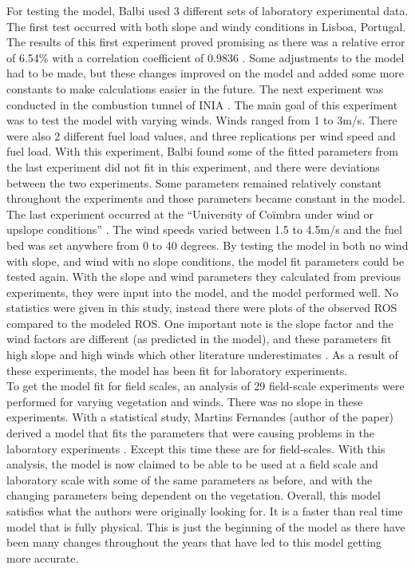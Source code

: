 \documentclass{article}
\begin{document}
\indent For testing the model, Balbi used 3 different sets of laboratory experimental data. The first test occurred with both slope and windy conditions in Lisboa, Portugal. The results of this first experiment proved promising as there was a relative error of 6.54\% with a correlation coefficient of 0.9836 \cite{Balbi2007}. Some adjustments to the model had to be made, but these changes improved on the model and added some more constants to make calculations easier in the future. The next experiment was conducted in the combustion tunnel of INIA \cite{Balbi2007}. The main goal of this experiment was to test the model with varying winds. Winds ranged from 1 to 3m/s. There were also 2 different fuel load values, and three replications per wind speed and fuel load. With this experiment, Balbi found some of the fitted parameters from the last experiment did not fit in this experiment, and there were deviations between the two experiments. Some parameters remained relatively constant throughout the experiments and those parameters became constant in the model. The last experiment occurred at the “University of Coïmbra under wind or upslope conditions” \cite{Balbi2007}. The wind speeds varied between 1.5 to 4.5m/s and the fuel bed was set anywhere from 0 to 40 degrees. By testing the model in both no wind with slope, and wind with no slope conditions, the model fit parameters could be tested again. With the slope and wind parameters they calculated from previous experiments, they were input into the model, and the model performed well. No statistics were given in this study, instead there were plots of the observed ROS compared to the modeled ROS. One important note is the slope factor and the wind factors are different (as predicted in the model), and these parameters fit high slope and high winds which other literature underestimates \cite{Balbi2007}. As a result of these experiments, the model has been fit for laboratory experiments. \\
\indent To get the model fit for field scales, an analysis of 29 field-scale experiments were performed for varying vegetation and winds. There was no slope in these experiments. With a statistical study, Martins Fernandes (author of the paper) derived a model that fits the parameters that were causing problems in the laboratory experiments \cite{Balbi2007}. Except this time these are for field-scales. With this analysis, the model is now claimed to be able to be used at a field scale and laboratory scale with some of the same parameters as before, and with the changing parameters being dependent on the vegetation. Overall, this model satisfies what the authors were originally looking for. It is a faster than real time model that is fully physical. This is just the beginning of the model as there have been many changes throughout the years that have led to this model getting more accurate. \\
\end{document}
